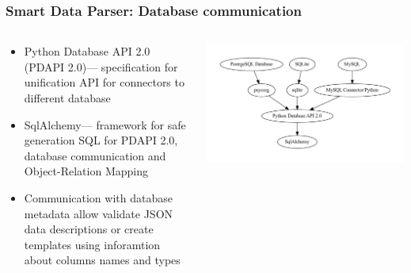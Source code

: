 \documentclass[8pt,pdf,hyperref={unicode}]{beamer}
\begin{document}
\begin{frame}
    \frametitle{Smart Data Parser: Database communication}
	\begin{columns}
	\begin{column}{0.5\linewidth}
		\begin{itemize}
				\item Python Database API 2.0 (PDAPI 2.0)\footnotemark --- specification for unification API for connectors to different database
				\item SqlAlchemy\footnotemark --- framework for safe generation SQL for PDAPI 2.0, database communication and Object-Relation Mapping
				\item Communication with database metadata allow validate JSON data descriptions or create templates using inforamtion about columns names and types
				
		\end{itemize}
	\end{column}
	\begin{column}{0.5\linewidth}
		\includegraphics[width=\linewidth]{image/schema_2.dot.pdf}
	\end{column}
\end{columns} 

\end{frame}
\end{document}
